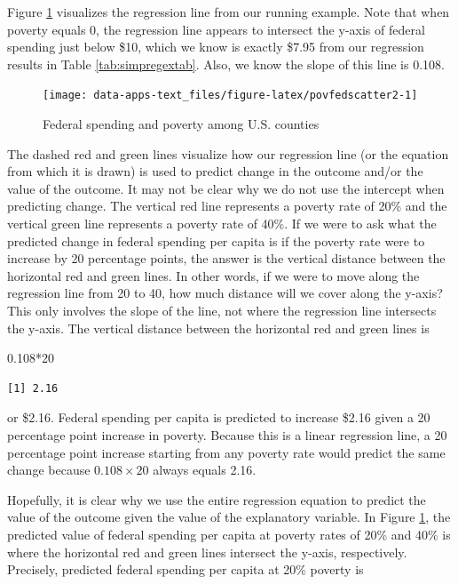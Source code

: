 \documentclass[
]{book}
\makeatletter
\newenvironment{Shaded}{\begin{snugshade}}{\end{snugshade}}
\newcommand{\DecValTok}[1]{\textcolor[rgb]{0.06,0.06,0.06}{#1}}
\newcommand{\FloatTok}[1]{\textcolor[rgb]{0.06,0.06,0.06}{#1}}
\newcommand{\SpecialCharTok}[1]{\textcolor[rgb]{0,0,0}{#1}}
\newenvironment{kframe}{%
\medskip{}
\setlength{\fboxsep}{.8em}
 \def\at@end@of@kframe{}%
 \ifinner\ifhmode%
  \def\at@end@of@kframe{\end{minipage}}%
  \begin{minipage}{\columnwidth}%
 \fi\fi%
 \def\FrameCommand##1{\hskip\@totalleftmargin \hskip-\fboxsep
 \colorbox{shadecolor}{##1}\hskip-\fboxsep
     \hskip-\linewidth \hskip-\@totalleftmargin \hskip\columnwidth}%
 \MakeFramed {\advance\hsize-\width
   \@totalleftmargin\z@ \linewidth\hsize
   \@setminipage}}%
 {\par\unskip\endMakeFramed%
 \at@end@of@kframe}
\renewenvironment{Shaded}{\begin{kframe}}{\end{kframe}}
\makeatother
\begin{document}
Figure \ref{fig:povfedscatter2} visualizes the regression line from our running example. Note that when poverty equals 0, the regression line appears to intersect the y-axis of federal spending just below \$10, which we know is exactly \$7.95 from our regression results in Table \ref{tab:simpregextab}. Also, we know the slope of this line is 0.108.

\begin{figure}

{\centering \texttt{[image: data-apps-text\_files/figure-latex/povfedscatter2-1]} 

}

\caption{Federal spending and poverty among U.S. counties}\label{fig:povfedscatter2}
\end{figure}

The dashed red and green lines visualize how our regression line (or the equation from which it is drawn) is used to predict change in the outcome and/or the value of the outcome. It may not be clear why we do not use the intercept when predicting change. The vertical red line represents a poverty rate of 20\% and the vertical green line represents a poverty rate of 40\%. If we were to ask what the predicted change in federal spending per capita is if the poverty rate were to increase by 20 percentage points, the answer is the vertical distance between the horizontal red and green lines. In other words, if we were to move along the regression line from 20 to 40, how much distance will we cover along the y-axis? This only involves the slope of the line, not where the regression line intersects the y-axis. The vertical distance between the horizontal red and green lines is

\begin{Shaded}
\begin{Highlighting}[]
\FloatTok{0.108}\SpecialCharTok{*}\DecValTok{20}
\end{Highlighting}
\end{Shaded}

\begin{verbatim}
[1] 2.16
\end{verbatim}

or \$2.16. Federal spending per capita is predicted to increase \$2.16 given a 20 percentage point increase in poverty. Because this is a linear regression line, a 20 percentage point increase starting from any poverty rate would predict the same change because \(0.108 \times 20\) always equals 2.16.

Hopefully, it is clear why we use the entire regression equation to predict the value of the outcome given the value of the explanatory variable. In Figure \ref{fig:povfedscatter2}, the predicted value of federal spending per capita at poverty rates of 20\% and 40\% is where the horizontal red and green lines intersect the y-axis, respectively. Precisely, predicted federal spending per capita at 20\% poverty is
\end{document}
